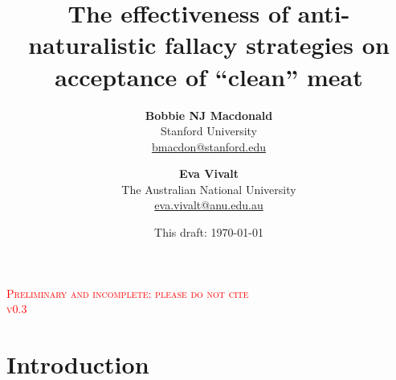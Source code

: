 \documentclass[12pt]{article}
\title{
    \vspace{-8mm}
    \Huge\selectfont\textbf{The effectiveness of anti-naturalistic fallacy strategies on acceptance of ``clean'' meat} \\[5mm] 
    \vspace{5mm}
}
\author{\textbf{Bobbie NJ Macdonald} \\
        Stanford University \\
        {\href{mailto:bmacdon@stanford.edu}{bmacdon@stanford.edu}} \\
    \and \textbf{Eva Vivalt} \\
        The Australian National University \\
        {\href{mailto:eva.vivalt@anu.edu.au}{eva.vivalt@anu.edu.au}} \\
}
\date{This draft: \today{}}
\newcommand{\todo}[1]{\textit{\textcolor{red}{$<$todo$>$ #1 $<$/todo$>$}}}
\begin{document}
\maketitle
\thispagestyle{empty}

\begin{centering}
    \Large \textsc{\textcolor{red}{Preliminary and incomplete: please do not cite}} \\
    \Large \textsc{\textcolor{red}{v0.3}} \\
    \vspace{10mm}
\end{centering}







\setcounter{page}{1}

\section{Introduction}
\label{sec:intro}

\end{document}
